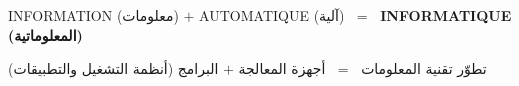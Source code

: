 \documentclass[11pt, a4paper]{article}
\begin{document}

\vspace{6pt}
\begin{rememberbox}
  \begin{center}
    INFORMATION (معلومات) $+$ AUTOMATIQUE (آلية) $\;=\;$ \textbf{\color{primary}INFORMATIQUE (المعلوماتية)}
  \end{center}
  \vspace{3pt}
  \begin{center}
    تطوّر تقنية المعلومات $\;=\;$ أجهزة المعالجة $+$ البرامج (أنظمة التشغيل والتطبيقات)
  \end{center}
\end{rememberbox}
\end{document}
